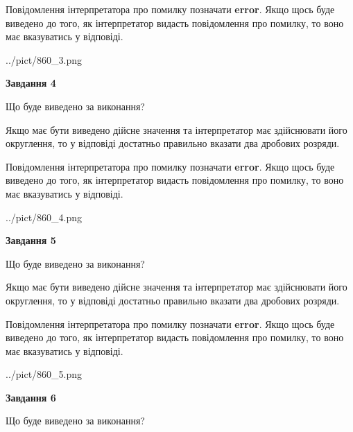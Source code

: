 \documentclass[12pt, ukrainian]{article}
\begin{document}
{\begin {Large}
Повідомлення інтерпретатора про помилку позначати \textbf{error}.
Якщо щось буде виведено до того, як інтерпретатор видасть повідомлення про помилку, 
то воно має вказуватись у відповіді. \par

\begin{center}
	{../pict/860_3.png}
\end{center}
\newpage

{\begin {center}\textbf{Завдання 4}\end {center}}\par
Що буде виведено за виконання? \par

Якщо має бути виведено дійсне значення та інтерпретатор має здійснювати його округлення, 
то у відповіді достатньо правильно вказати два дробових розряди.

Повідомлення інтерпретатора про помилку позначати \textbf{error}.
Якщо щось буде виведено до того, як інтерпретатор видасть повідомлення про помилку, 
то воно має вказуватись у відповіді. \par

\begin{center}
	{../pict/860_4.png}
\end{center}
\newpage

{\begin {center}\textbf{Завдання 5}\end {center}}\par
Що буде виведено за виконання? \par

Якщо має бути виведено дійсне значення та інтерпретатор має здійснювати його округлення, 
то у відповіді достатньо правильно вказати два дробових розряди.

Повідомлення інтерпретатора про помилку позначати \textbf{error}.
Якщо щось буде виведено до того, як інтерпретатор видасть повідомлення про помилку, 
то воно має вказуватись у відповіді. \par

\begin{center}
	{../pict/860_5.png}
\end{center}
\newpage

{\begin {center}\textbf{Завдання 6}\end {center}}\par
Що буде виведено за виконання? \par


\end{Large}}
\end{document}
